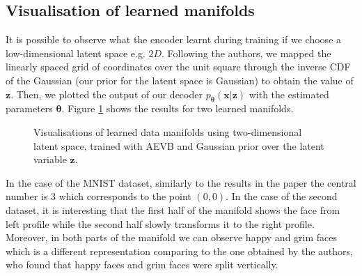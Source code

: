 \documentclass[../report.tex]{subfiles}
\begin{document}
\subsection{Visualisation of learned manifolds}
It is possible to observe what the encoder learnt during training if we choose a low-dimensional latent space e.g. $2D$. Following the authors, we mapped the linearly spaced grid of coordinates over the unit square through the inverse CDF of the Gaussian (our prior for the latent space is Gaussian) to obtain the value of $\mathbf{z}$. Then, we plotted the output of our decoder $p_{\mathbf{\theta}} (\mathbf{x}| \mathbf{z})$ with the estimated parameters $\mathbf{\theta}$. Figure \ref{fig:FREY} shows the results for two learned manifolds.

\begin{figure}[!htb]
%
\begin{center}
\end{center}
\endminipage 
{}  
\begin{center}
\end{center}
\endminipage\hfill

  \caption[1]{Visualisations of learned data manifolds using two-dimensional latent space, trained with AEVB and Gaussian prior over the latent variable $\mathbf{z}$.}
\label{fig:FREY}
\end{figure}

In the case of the MNIST dataset, similarly to the results in the paper the central number is $3$ which corresponds to the point $(0,0)$. In the case of the second dataset, it is interesting that the first half of the manifold shows the face from left profile while the second half slowly transforms it to the right profile. Moreover, in both parts of the manifold we can observe happy and grim faces which is a different representation comparing to the one obtained by the authors, who found that happy faces and grim faces were split vertically.
\end{document}
